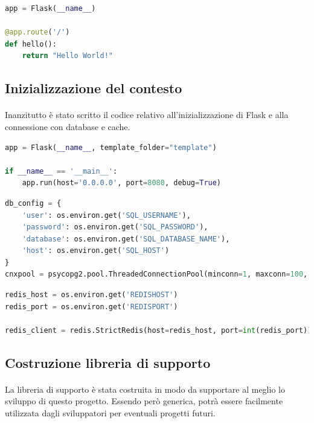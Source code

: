 \documentclass[11pt,a4paper,english]{article}
\begin{document}
\begin{lstlisting}[language=python, caption=Hello world con Flask]
app = Flask(__name__)

@app.route('/')
def hello():
    return "Hello World!"
\end{lstlisting}

\subsection{Inizializzazione del contesto}

\paragraph{} Inanzitutto è stato scritto il codice relativo all'inizializzazione di Flask e alla connessione con database e cache.

\begin{lstlisting}[language=python, caption=Inizializzazione del server]
app = Flask(__name__, template_folder="template")

if __name__ == '__main__':
    app.run(host='0.0.0.0', port=8080, debug=True)
\end{lstlisting}

\begin{lstlisting}[language=python, caption=Connessione al database]
db_config = {
    'user': os.environ.get('SQL_USERNAME'),
    'password': os.environ.get('SQL_PASSWORD'),
    'database': os.environ.get('SQL_DATABASE_NAME'),
    'host': os.environ.get('SQL_HOST')
}
cnxpool = psycopg2.pool.ThreadedConnectionPool(minconn=1, maxconn=100, **db_config)
\end{lstlisting}

\begin{lstlisting}[language=python, caption=Connessione alla cache Redis]
redis_host = os.environ.get('REDISHOST')
redis_port = os.environ.get('REDISPORT')

redis_client = redis.StrictRedis(host=redis_host, port=int(redis_port)) if redis_host is not None else None
\end{lstlisting}


\subsection{Costruzione libreria di supporto}

\paragraph{} La libreria di supporto è stata costruita in modo da supportare al meglio lo sviluppo di questo progetto. Essendo però generica, potrà essere facilmente utilizzata dagli sviluppatori per eventuali progetti futuri.
\end{document}
